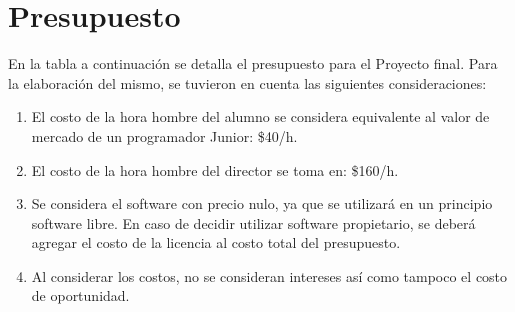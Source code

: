\documentclass[bibliography=openstyle,DIV=12]{scrartcl}
\begin{document}
\section{Presupuesto}

En la tabla a continuación se detalla el presupuesto para el Proyecto final.
Para la elaboración del mismo, se tuvieron en cuenta las siguientes consideraciones:
\begin{enumerate}
\item El costo de la hora hombre del alumno se considera equivalente al valor
  de mercado de un programador Junior: \$40/h.
\item El costo de la hora hombre del director se toma en: \$160/h.
\item Se considera el software con precio nulo, ya que se utilizará en un principio
  software libre. En caso de decidir utilizar software propietario, se deberá agregar el
  costo de la licencia al costo total del presupuesto.
\item Al considerar los costos, no se consideran intereses así como tampoco el
  costo de oportunidad.
\end{enumerate}
\end{document}
